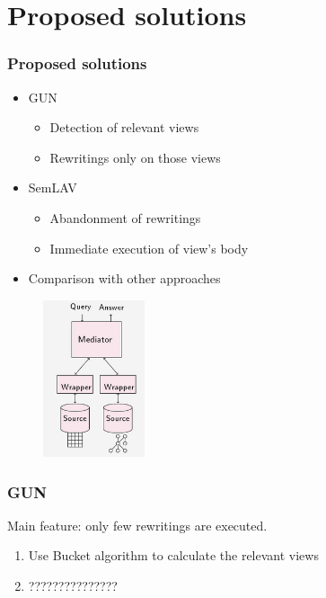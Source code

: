 \documentclass{beamer}
\begin{document}
\section{Proposed solutions}
\begin{frame}
\frametitle{Proposed solutions}
\begin{center}
\begin{minipage}{0.69\textwidth}
        \begin{itemize}
\item GUN
	\begin{itemize}
	\item Detection of relevant views
	\item Rewritings only on those views
	\end{itemize}
\item SemLAV
	\begin{itemize}
	\item Abandonment of rewritings
	\item Immediate execution of view's body
	\end{itemize}
\item Comparison with other approaches
\end{itemize}
\end{minipage}
\begin{minipage}{0.29\textwidth}
	\begin{figure}
		\includegraphics[width=3cm]{Images/Solutions.png}
	\end{figure}
\end{minipage}
\end{center}
\end{frame}

\begin{frame}
\frametitle{GUN}
\begin{center}
Main feature: only few rewritings are executed.
\begin{enumerate}
\item Use Bucket algorithm to calculate the relevant views
\item ???????????????
\end{enumerate}
\end{center}
\end{frame}
\end{document}
